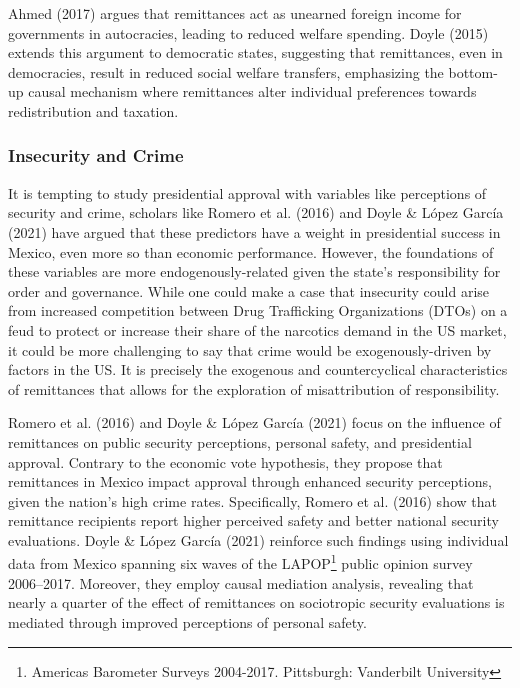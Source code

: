 \documentclass[
]{article}
\begin{document}
Ahmed (2017) argues that remittances act as unearned foreign income for
governments in autocracies, leading to reduced welfare spending. Doyle
(2015) extends this argument to democratic states, suggesting that
remittances, even in democracies, result in reduced social welfare
transfers, emphasizing the bottom-up causal mechanism where remittances
alter individual preferences towards redistribution and taxation.

\hypertarget{insecurity-and-crime}{%
\subsubsection{Insecurity and Crime}\label{insecurity-and-crime}}

It is tempting to study presidential approval with variables like
perceptions of security and crime, scholars like Romero et al. (2016)
and Doyle \& López García (2021) have argued that these predictors have
a weight in presidential success in Mexico, even more so than economic
performance. However, the foundations of these variables are more
endogenously-related given the state's responsibility for order and
governance. While one could make a case that insecurity could arise from
increased competition between Drug Trafficking Organizations (DTOs) on a
feud to protect or increase their share of the narcotics demand in the
US market, it could be more challenging to say that crime would be
exogenously-driven by factors in the US. It is precisely the exogenous
and countercyclical characteristics of remittances that allows for the
exploration of misattribution of responsibility.

Romero et al. (2016) and Doyle \& López García (2021) focus on the
influence of remittances on public security perceptions, personal
safety, and presidential approval. Contrary to the economic vote
hypothesis, they propose that remittances in Mexico impact approval
through enhanced security perceptions, given the nation's high crime
rates. Specifically, Romero et al. (2016) show that remittance
recipients report higher perceived safety and better national security
evaluations. Doyle \& López García (2021) reinforce such findings using
individual data from Mexico spanning six waves of the LAPOP\footnote{Americas
  Barometer Surveys 2004-2017. Pittsburgh: Vanderbilt University} public
opinion survey 2006--2017. Moreover, they employ causal mediation
analysis, revealing that nearly a quarter of the effect of remittances
on sociotropic security evaluations is mediated through improved
perceptions of personal safety.
\end{document}
